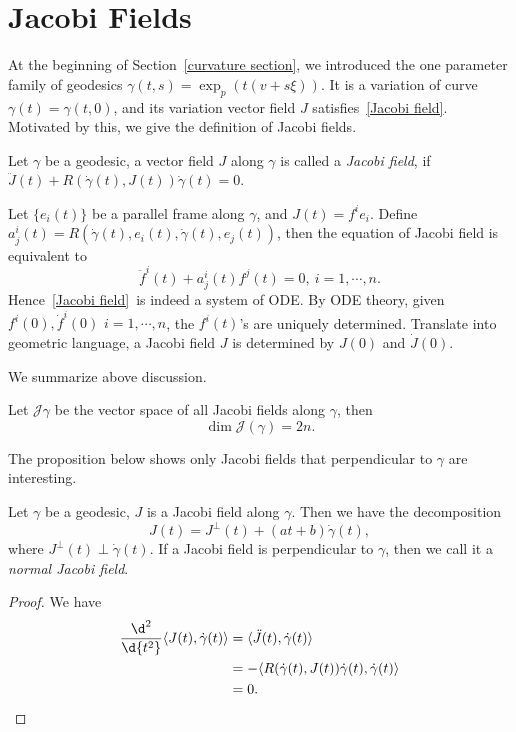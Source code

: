 \section{Jacobi Fields}
At the beginning of Section~\ref{curvature section}, we introduced the one parameter family of geodesics $\gamma(t,s)=\exp_p(t(v+s\xi))$.
It is a variation of curve $\gamma(t)=\gamma(t,0)$, and its variation vector field $J$ satisfies~\eqref{Jacobi field}.
Motivated by this, we give the definition of Jacobi fields.

\begin{defn}
    Let $\gamma$ be a geodesic, a vector field $J$ along $\gamma$ is called a \emph{Jacobi field}, if $\ddot{J}(t)+R(\dot\gamma(t),J(t))\dot\gamma(t)=0$.
\end{defn}

Let $\{e_i(t)\}$ be a parallel frame along $\gamma$, and $J(t)=f^ie_i$.
Define $a^i_j(t)=R(\dot\gamma(t),e_i(t),\dot\gamma(t),e_j(t))$, then the equation of Jacobi field is equivalent to
\[\ddot{f}^i(t)+a^i_j(t)f^j(t)=0,\ i=1,\cdots,n.\]
Hence~\eqref{Jacobi field}~is indeed a system of ODE.
By ODE theory, given $f^i(0),\dot{f}^i(0)$ $i=1,\cdots,n$, the $f^i(t)$'s are uniquely determined.
Translate into geometric language, a Jacobi field $J$ is determined by $J(0)$ and $\dot{J}(0)$.

We summarize above discussion.

\begin{prop}
    Let $\mathscr{J}\gamma$ be the vector space of all Jacobi fields along $\gamma$, then 
    \[\dim\mathscr{J}(\gamma)=2n.\]
\end{prop}

The proposition below shows only Jacobi fields that perpendicular to $\gamma$ are interesting.
\begin{prop}
    Let $\gamma$ be a geodesic, $J$ is a Jacobi field along $\gamma$.
    Then we have the decomposition
    \[J(t)=J^\perp(t)+(at+b)\dot\gamma(t),\]
    where $J^\perp(t)\perp\dot\gamma(t)$.
    If a Jacobi field is perpendicular to $\gamma$, then we call it a \emph{normal Jacobi field}.
\end{prop}
\begin{proof}
    We have
    \begin{align*}
        \frac{\d^2{}}{\d{t^2}}\langle J(t),\dot\gamma(t)\rangle&=\langle\ddot{J}(t),\dot\gamma(t)\rangle\\
        &=-\langle R(\dot\gamma(t),J(t))\dot\gamma(t),\dot\gamma(t)\rangle\\
        &=0.\qedhere
    \end{align*}
\end{proof}

